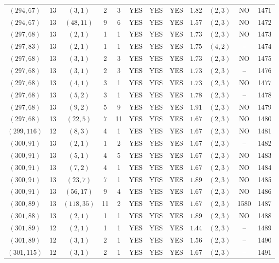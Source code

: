 \begin{longtable}{|c|c|c|c|c|c|c|c|c|c|c|c|}
$(294,67)$ & 13 & $(3,1)$ & 2 & 3 & YES & YES & YES & $1.82$ & $(2,3)$ & NO & 1471\\
$(294,67)$ & 13 & $(48,11)$ & 9 & 6 & YES & YES & YES & $1.57$ & $(2,3)$ & NO & 1472\\
$(297,68)$ & 13 & $(2,1)$ & 1 & 1 & YES & YES & YES & $1.73$ & $(2,3)$ & NO & 1473\\
$(297,83)$ & 13 & $(2,1)$ & 1 & 1 & YES & YES & YES & $1.75$ & $(4,2)$ & -- & 1474\\
$(297,68)$ & 13 & $(3,1)$ & 2 & 3 & YES & YES & YES & $1.73$ & $(2,3)$ & NO & 1475\\
$(297,68)$ & 13 & $(3,1)$ & 2 & 3 & YES & YES & YES & $1.73$ & $(2,3)$ & -- & 1476\\
$(297,68)$ & 13 & $(4,1)$ & 3 & 1 & YES & YES & YES & $1.73$ & $(2,3)$ & NO & 1477\\
$(297,68)$ & 13 & $(5,2)$ & 3 & 1 & YES & YES & YES & $1.78$ & $(2,3)$ & -- & 1478\\
$(297,68)$ & 13 & $(9,2)$ & 5 & 9 & YES & YES & YES & $1.91$ & $(2,3)$ & NO & 1479\\
$(297,68)$ & 13 & $(22,5)$ & 7 & 11 & YES & YES & YES & $1.67$ & $(2,3)$ & NO & 1480\\
$(299,116)$ & 12 & $(8,3)$ & 4 & 1 & YES & YES & YES & $1.67$ & $(2,3)$ & NO & 1481\\
$(300,91)$ & 13 & $(2,1)$ & 1 & 2 & YES & YES & YES & $1.67$ & $(2,3)$ & -- & 1482\\
$(300,91)$ & 13 & $(5,1)$ & 4 & 5 & YES & YES & YES & $1.67$ & $(2,3)$ & NO & 1483\\
$(300,91)$ & 13 & $(7,2)$ & 4 & 1 & YES & YES & YES & $1.67$ & $(2,3)$ & NO & 1484\\
$(300,91)$ & 13 & $(23,7)$ & 7 & 1 & YES & YES & YES & $1.89$ & $(2,3)$ & NO & 1485\\
$(300,91)$ & 13 & $(56,17)$ & 9 & 4 & YES & YES & YES & $1.67$ & $(2,3)$ & NO & 1486\\
$(300,89)$ & 13 & $(118,35)$ & 11 & 2 & YES & YES & YES & $1.67$ & $(2,3)$ & 1580 & 1487\\
$(301,88)$ & 13 & $(2,1)$ & 1 & 1 & YES & YES & YES & $1.89$ & $(2,3)$ & NO & 1488\\
$(301,89)$ & 12 & $(2,1)$ & 1 & 1 & YES & YES & YES & $1.44$ & $(2,3)$ & -- & 1489\\
$(301,89)$ & 12 & $(3,1)$ & 2 & 1 & YES & YES & YES & $1.56$ & $(2,3)$ & -- & 1490\\
$(301,115)$ & 12 & $(3,1)$ & 2 & 1 & YES & YES & YES & $1.67$ & $(2,3)$ & -- & 1491\\

\end{longtable}
